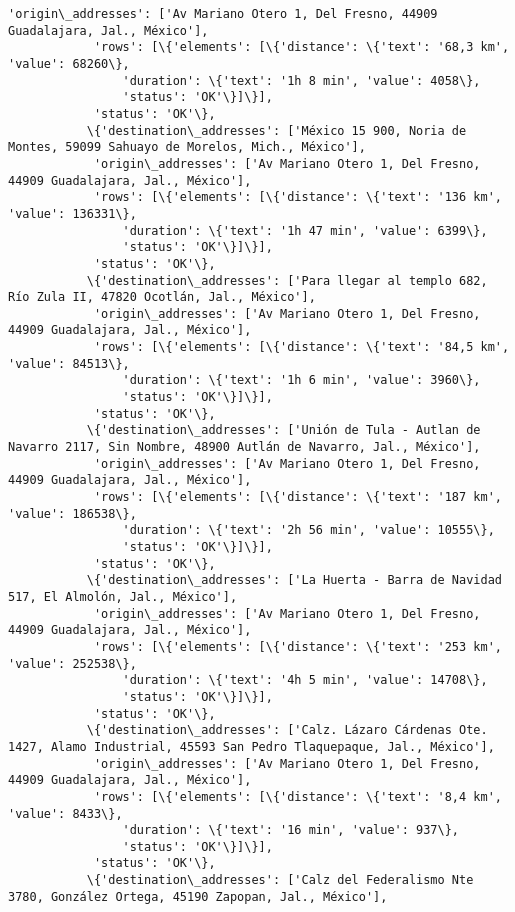 \documentclass[11pt]{article}
\begin{document}
\begin{Verbatim}[commandchars=\\\{\}]
            'origin\_addresses': ['Av Mariano Otero 1, Del Fresno, 44909 Guadalajara, Jal., México'],
            'rows': [\{'elements': [\{'distance': \{'text': '68,3 km', 'value': 68260\},
                'duration': \{'text': '1h 8 min', 'value': 4058\},
                'status': 'OK'\}]\}],
            'status': 'OK'\},
           \{'destination\_addresses': ['México 15 900, Noria de Montes, 59099 Sahuayo de Morelos, Mich., México'],
            'origin\_addresses': ['Av Mariano Otero 1, Del Fresno, 44909 Guadalajara, Jal., México'],
            'rows': [\{'elements': [\{'distance': \{'text': '136 km', 'value': 136331\},
                'duration': \{'text': '1h 47 min', 'value': 6399\},
                'status': 'OK'\}]\}],
            'status': 'OK'\},
           \{'destination\_addresses': ['Para llegar al templo 682, Río Zula II, 47820 Ocotlán, Jal., México'],
            'origin\_addresses': ['Av Mariano Otero 1, Del Fresno, 44909 Guadalajara, Jal., México'],
            'rows': [\{'elements': [\{'distance': \{'text': '84,5 km', 'value': 84513\},
                'duration': \{'text': '1h 6 min', 'value': 3960\},
                'status': 'OK'\}]\}],
            'status': 'OK'\},
           \{'destination\_addresses': ['Unión de Tula - Autlan de Navarro 2117, Sin Nombre, 48900 Autlán de Navarro, Jal., México'],
            'origin\_addresses': ['Av Mariano Otero 1, Del Fresno, 44909 Guadalajara, Jal., México'],
            'rows': [\{'elements': [\{'distance': \{'text': '187 km', 'value': 186538\},
                'duration': \{'text': '2h 56 min', 'value': 10555\},
                'status': 'OK'\}]\}],
            'status': 'OK'\},
           \{'destination\_addresses': ['La Huerta - Barra de Navidad 517, El Almolón, Jal., México'],
            'origin\_addresses': ['Av Mariano Otero 1, Del Fresno, 44909 Guadalajara, Jal., México'],
            'rows': [\{'elements': [\{'distance': \{'text': '253 km', 'value': 252538\},
                'duration': \{'text': '4h 5 min', 'value': 14708\},
                'status': 'OK'\}]\}],
            'status': 'OK'\},
           \{'destination\_addresses': ['Calz. Lázaro Cárdenas Ote. 1427, Alamo Industrial, 45593 San Pedro Tlaquepaque, Jal., México'],
            'origin\_addresses': ['Av Mariano Otero 1, Del Fresno, 44909 Guadalajara, Jal., México'],
            'rows': [\{'elements': [\{'distance': \{'text': '8,4 km', 'value': 8433\},
                'duration': \{'text': '16 min', 'value': 937\},
                'status': 'OK'\}]\}],
            'status': 'OK'\},
           \{'destination\_addresses': ['Calz del Federalismo Nte 3780, González Ortega, 45190 Zapopan, Jal., México'],

\end{Verbatim}
\end{document}
